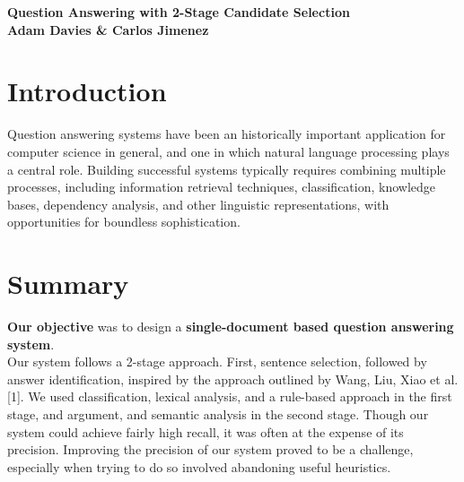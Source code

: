 \documentclass[a1,landscape]{a0poster}
\begin{document}
\begin{minipage}[c]{0.9\linewidth}
\centering
\Huge \color{NavyBlue} \textbf{Question Answering with 2-Stage Candidate Selection} \color{Black}\\ %
\LARGE \textbf{Adam Davies \& Carlos Jimenez}\\ %
\end{minipage}

\vspace{1cm} %


\begin{multicols}{3} %
\Large

\color{Navy} %
\section*{\LARGE Introduction}
Question answering systems have been an historically important application for computer science in general, and one in which natural language processing plays a central role. Building successful systems typically requires combining multiple processes, including information retrieval techniques, classification, knowledge bases, dependency analysis, and other linguistic representations, with opportunities for boundless sophistication. 


\color{SaddleBrown} %

\section*{\LARGE Summary}
\textbf{Our objective} was to design a \textbf{single-document based question answering system}.\\
Our system follows a 2-stage approach. First, sentence selection, followed by answer identification, inspired by the approach outlined by Wang, Liu, Xiao et al.[1]. We used classification, lexical analysis, and a rule-based approach in the first stage, and argument, and semantic analysis in the second stage. Though our system could achieve fairly high recall, it was often at the expense of its precision. Improving the precision of our system proved to be a challenge, especially when trying to do so involved abandoning useful heuristics. 


\end{multicols}
\end{document}
